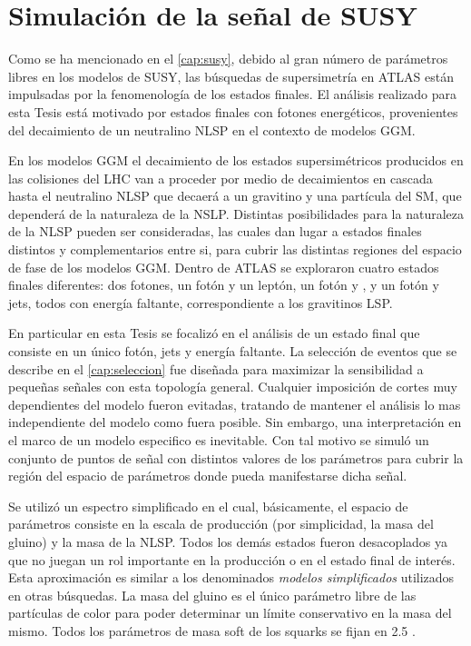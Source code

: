 \section{Simulación de la señal de SUSY}\label{sec:sig_samples}

Como se ha mencionado en el \cref{cap:susy}, debido al gran número de parámetros
libres en los modelos de SUSY, las búsquedas de supersimetría en ATLAS están
impulsadas por la fenomenología de los estados finales. El análisis realizado
para esta Tesis está motivado por estados finales con fotones energéticos,
provenientes del decaimiento de un neutralino NLSP en el contexto de modelos
GGM.

En los modelos GGM el decaimiento de los estados supersimétricos producidos en
las colisiones del LHC van a proceder por medio de decaimientos en cascada hasta
el neutralino NLSP que decaerá a un gravitino y una partícula del SM, que
dependerá de la naturaleza de la NSLP. Distintas posibilidades para la
naturaleza de la NLSP pueden ser consideradas, las cuales dan lugar a estados
finales distintos y complementarios entre si, para cubrir las distintas regiones
del espacio de fase de los modelos GGM. Dentro de ATLAS se exploraron cuatro
estados finales diferentes: dos fotones, un fotón y un leptón, un fotón y
{\bjets}, y un fotón y jets, todos con energía faltante, correspondiente a los
gravitinos LSP.

En particular en esta Tesis se focalizó en el análisis de un estado final que
consiste en un único fotón, jets y energía faltante.
La selección de eventos que se describe en el \cref{cap:seleccion} fue diseñada para
maximizar la sensibilidad a pequeñas señales con esta topología general.
Cualquier imposición de cortes muy dependientes del modelo fueron evitadas,
tratando de mantener el análisis lo mas independiente del modelo como fuera
posible. Sin embargo, una interpretación en el marco de un modelo especifico es
inevitable. Con tal motivo se simuló un conjunto de puntos de señal con
distintos valores de los parámetros para cubrir la región del espacio de
parámetros donde pueda manifestarse dicha señal.


Se utilizó un espectro simplificado en el cual, básicamente, el espacio de
parámetros consiste en la escala de producción (por simplicidad, la masa del
gluino) y la masa de la NLSP. Todos los demás estados fueron desacoplados ya que
no juegan un rol importante en la producción o en el estado final de interés.
Esta aproximación es similar a los denominados \emph{modelos simplificados}
utilizados en otras búsquedas.
La masa del gluino es el único parámetro libre de las partículas de color para
poder determinar un límite conservativo en la masa del mismo. Todos los
parámetros de masa soft de los squarks se fijan en 2.5 \tev.

